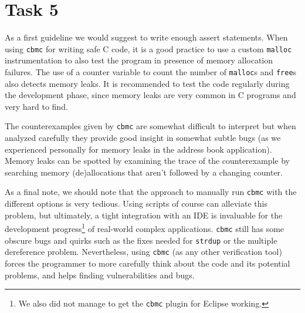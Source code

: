 \section*{Task 5}
As a first guideline we would suggest to write enough assert statements. When using \texttt{cbmc} for writing safe C code, it is a good practice to use a custom \texttt{malloc} instrumentation to also test the program in presence of memory allocation failures. The use of a counter variable to count the number of \texttt{malloc}s and \texttt{free}s also detects memory leaks. It is recommended to test the code regularly during the development phase, since memory leaks are very common in C programs and very hard to find. 

The counterexamples given by \texttt{cbmc} are somewhat difficult to interpret but when analyzed carefully they provide good insight in somewhat subtle bugs (as we experienced personally for memory leaks in the address book application). Memory leaks can be spotted by examining the trace of the counterexample by searching memory (de)allocations that aren't followed by a changing counter.


As a final note, we should note that the approach to manually run \texttt{cbmc} with the different options is very tedious. Using scripts of course can alleviate this problem, but ultimately, a tight integration with an IDE is invaluable for the development progress\footnote{We also did not manage to get the \texttt{cbmc} plugin for Eclipse working.} of real-world complex applications. \texttt{cbmc} still has some obscure bugs and quirks such as the fixes needed for \texttt{strdup} or the multiple dereference problem. Nevertheless, using \texttt{cbmc} (as any other verification tool) forces the programmer to more carefully think about the code and its potential problems, and helps finding  vulnerabilities and bugs.

